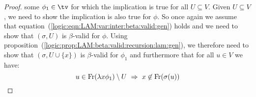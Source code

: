 \begin{proof}
    some $\phi_{1}\in\tv$ for which the implication is true for all
    $U\subseteq V$. Given $U\subseteq V$, we need to show the implication
    is also true for $\phi$. So once again we assume that
    equation~(\ref{logic:eqn:LAM:var:inter:beta:valid:gen}) holds and we
    need to show that $(\sigma,U)$ is $\beta$-valid for $\phi$. Using
    proposition~(\ref{logic:prop:LAM:beta:valid:recursion:lam:gen}), we 
    therefore need to show that $(\sigma, U\cup\{x\})$ is $\beta$-valid
    for $\phi_{1}$ and furthermore that for all $u\in V$ we have:
        \[
            u\in\free(\lambda x\phi_{1})\setminus U
            \ \Rightarrow\ 
            x\not\in\free(\sigma(u))
        \]
 \end{proof}
